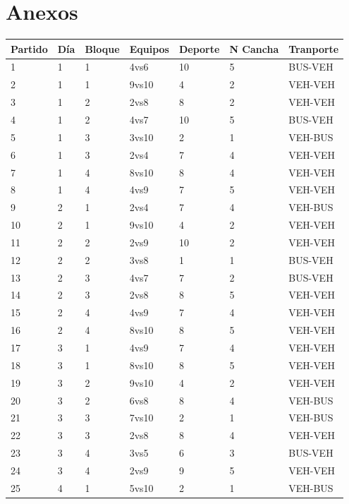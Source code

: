 \section{Anexos}

\begin{center}
\begin{tabular}{|l|l|l|l|l|l|l|}
\hline
Partido & Día & Bloque & Equipos & Deporte & N Cancha & Tranporte     \\
\hline \hline
1 & 1 & 1 & 4vs6 & 10 & 5 & BUS-VEH \\ \hline
2 & 1 & 1 & 9vs10 & 4 & 2 & VEH-VEH \\ \hline
3 & 1 & 2 & 2vs8 & 8 & 2 & VEH-VEH \\ \hline
4 & 1 & 2 & 4vs7 & 10 & 5 & BUS-VEH \\ \hline
5 & 1 & 3 & 3vs10 & 2 & 1 & VEH-BUS \\ \hline
6 & 1 & 3 & 2vs4 & 7 & 4 & VEH-VEH \\ \hline
7 & 1 & 4 & 8vs10 & 8 & 4 & VEH-VEH \\ \hline
8 & 1 & 4 & 4vs9 & 7 & 5 & VEH-VEH \\ \hline
9 & 2 & 1 & 2vs4 & 7 & 4 & VEH-BUS \\ \hline
10 & 2 & 1 & 9vs10 & 4 & 2 & VEH-VEH \\ \hline
11 & 2 & 2 & 2vs9 & 10 & 2 & VEH-VEH \\ \hline
12 & 2 & 2 & 3vs8 & 1 & 1 & BUS-VEH \\ \hline
13 & 2 & 3 & 4vs7 & 7 & 2 & BUS-VEH \\ \hline
14 & 2 & 3 & 2vs8 & 8 & 5 & VEH-VEH \\ \hline
15 & 2 & 4 & 4vs9 & 7 & 4 & VEH-VEH \\ \hline
16 & 2 & 4 & 8vs10 & 8 & 5 & VEH-VEH \\ \hline
17 & 3 & 1 & 4vs9 & 7 & 4 & VEH-VEH \\ \hline
18 & 3 & 1 & 8vs10 & 8 & 5 & VEH-VEH \\ \hline
19 & 3 & 2 & 9vs10 & 4 & 2 & VEH-VEH \\ \hline
20 & 3 & 2 & 6vs8 & 8 & 4 & VEH-BUS \\ \hline
21 & 3 & 3 & 7vs10 & 2 & 1 & VEH-BUS \\ \hline
22 & 3 & 3 & 2vs8 & 8 & 4 & VEH-VEH \\ \hline
23 & 3 & 4 & 3vs5 & 6 & 3 & BUS-VEH \\ \hline
24 & 3 & 4 & 2vs9 & 9 & 5 & VEH-VEH \\ \hline
25 & 4 & 1 & 5vs10 & 2 & 1 & VEH-BUS \\ \hline

\end{tabular}
\end{center}
